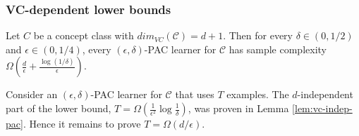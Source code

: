 \documentclass[main.tex]{subfiles}
\begin{document}
%
%
%
% 
%	

\subsubsection{VC-dependent lower bounds}

\begin{theorem}\label{thm:vc-dep-it}
Let $C$ be a concept class with $dim_{VC}(\mathcal{C}) = d + 1$. Then for every $\delta \in (0,1/2)$ and $\epsilon \in (0,1/4)$, every $(\epsilon,\delta)$-PAC learner for $\mathcal{C}$ has sample complexity $\Omega(\frac{d}{\epsilon} + \frac{\log(1/\delta)}{\epsilon})$.
\end{theorem}

Consider an $(\epsilon,\delta)$-PAC learner for $\mathcal{C}$ that uses $T$ examples. The $d$-independent part of the lower bound, $T = \Omega(\frac{1}{\epsilon^2}\log \frac{1}{\delta})$, was proven in Lemma \ref{lem:vc-indep-pac}. Hence it remains to prove $T = \Omega(d/\epsilon)$. 
\end{document}
